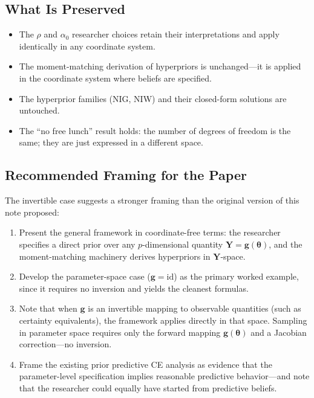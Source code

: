 \documentclass[11pt,a4paper]{article}
\theoremstyle{definition}
\newcommand{\btheta}{\boldsymbol{\theta}}
\begin{document}
\subsection{What Is Preserved}

\begin{itemize}
    \item The $\rho$ and $\alpha_0$ researcher choices retain their
    interpretations and apply identically in any coordinate system.

    \item The moment-matching derivation of hyperpriors is unchanged---it is
    applied in the coordinate system where beliefs are specified.

    \item The hyperprior families (NIG, NIW) and their closed-form solutions
    are untouched.

    \item The ``no free lunch'' result holds: the number of degrees of freedom
    is the same; they are just expressed in a different space.
\end{itemize}

\subsection{Recommended Framing for the Paper}

The invertible case suggests a stronger framing than the original version of
this note proposed:

\begin{enumerate}
    \item Present the general framework in coordinate-free terms: the
    researcher specifies a direct prior over any $p$-dimensional quantity
    $\mathbf{Y} = \mathbf{g}(\btheta)$, and the moment-matching machinery
    derives hyperpriors in $\mathbf{Y}$-space.

    \item Develop the parameter-space case ($\mathbf{g} = \text{id}$) as the
    primary worked example, since it requires no inversion and yields the
    cleanest formulas.

    \item Note that when $\mathbf{g}$ is an invertible mapping to observable
    quantities (such as certainty equivalents), the framework applies directly
    in that space. Sampling in parameter space requires only the forward
    mapping $\mathbf{g}(\btheta)$ and a Jacobian correction---no inversion.

    \item Frame the existing prior predictive CE analysis as evidence that the
    parameter-level specification implies reasonable predictive behavior---and
    note that the researcher could equally have started from predictive beliefs.
\end{enumerate}
\end{document}
